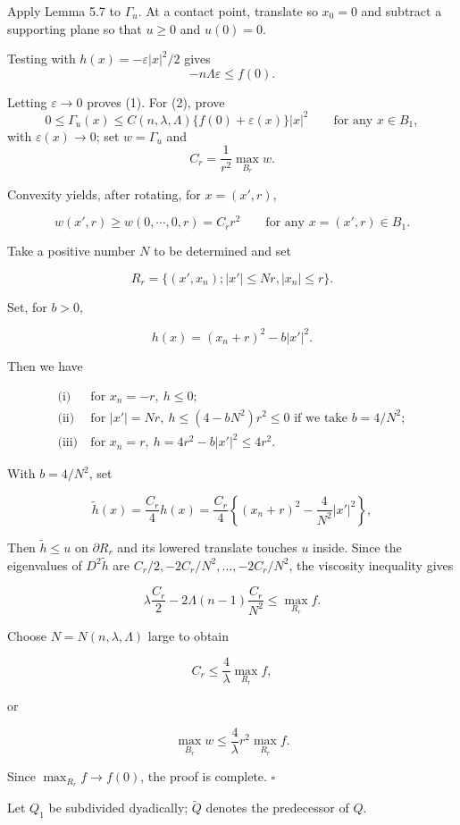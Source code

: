 Apply Lemma 5.7 to $\Gamma_u$. At a contact point, translate so $x_0=0$ and subtract a supporting plane so that $u\ge0$ and $u(0)=0$.

Testing with $h(x)=-\varepsilon|x|^2/2$ gives
\[
-n\Lambda\varepsilon\le f(0).
\]

Letting $\varepsilon\to0$ proves (1). For (2), prove
\[
0\le \Gamma_u(x)\le C(n,\lambda,\Lambda)\{f(0)+\varepsilon(x)\}|x|^2 \qquad \text{for any } x\in B_1,
\]
with $\varepsilon(x)\to0$; set $w=\Gamma_u$ and
\[
C_r=\frac{1}{r^2}\max_{B_r} w.
\]


Convexity yields, after rotating, for $x=(x',r)$,

\[
w(x',r)\geq w(0,\cdots,0,r)=C_r r^2 \qquad \text{for any } x=(x',r)\in B_1.
\]

Take a positive number $N$ to be determined and set

\[
R_r=\{(x',x_n);|x'|\leq Nr, |x_n|\leq r\}.
\]

Set, for $b>0$,

\[
h(x)=(x_n+r)^2-b|x'|^2.
\]

Then we have

\begin{align*}
\text{(i)}\ & \text{for } x_n=-r,\ h\leq 0;\\
\text{(ii)}\ & \text{for } |x'|=Nr,\ h\leq (4-bN^2)r^2\leq 0 \text{ if we take } b=4/N^2;\\
\text{(iii)}\ & \text{for } x_n=r,\ h=4r^2-b|x'|^2\leq 4r^2.
\end{align*}

With $b=4/N^2$, set

\[
\tilde h(x)=\frac{C_r}{4}h(x)=\frac{C_r}{4}\left\{(x_n+r)^2-\frac{4}{N^2}|x'|^2\right\},
\]

Then $\tilde h\leq u$ on $\partial R_r$ and its lowered translate touches $u$ inside. Since the eigenvalues of $D^2\tilde h$ are $C_r/2,-2C_r/N^2,\ldots,-2C_r/N^2$, the viscosity inequality gives

\[
\lambda \frac{C_r}{2}-2\Lambda(n-1)\frac{C_r}{N^2}\leq \max_{R_r} f.
\]

Choose $N=N(n,\lambda,\Lambda)$ large to obtain

\[
C_r\leq \frac{4}{\lambda}\max_{R_r} f,
\]

or

\[
\max_{B_r} w\leq \frac{4}{\lambda}r^2\max_{R_r} f.
\]

Since $\max_{R_r}f\to f(0)$, the proof is complete. \hfill$\square$

Let $Q_1$ be subdivided dyadically; $\tilde Q$ denotes the predecessor of $Q$.

